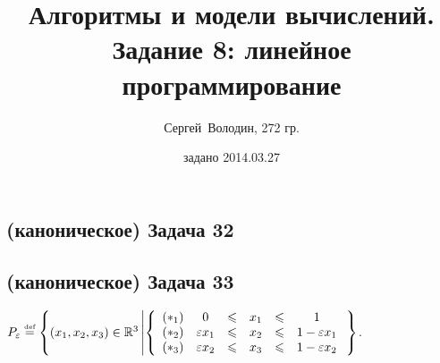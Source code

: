 \documentclass[a4paper]{article}
\date{задано 2014.03.27}
\author{Сергей~Володин, 272 гр.}
\title{Алгоритмы и модели вычислений.\\Задание 8: линейное программирование}
\def\eps{\varepsilon}
\def\eqdef{\overset{\mbox{\tiny def}}{=}}
\newcommand{\RR}{\mathbb{R}}
\begin{document}
\maketitle
\subsection*{(каноническое) Задача 32}
\newpage
\subsection*{(каноническое) Задача 33}
$P_\eps\eqdef\left\{(x_1,x_2,x_3)\in\RR^3\left| \left\{\begin{array}{lclllc}
(*_1) & 0        & \leqslant & x_1 & \leqslant & 1\\
(*_2) & \eps x_1 & \leqslant & x_2 & \leqslant & 1-\eps x_1\\
(*_3) & \eps x_2 & \leqslant & x_3 & \leqslant & 1-\eps x_2
\end{array}
\right.\right.\right\}$.\newline
\end{document}
